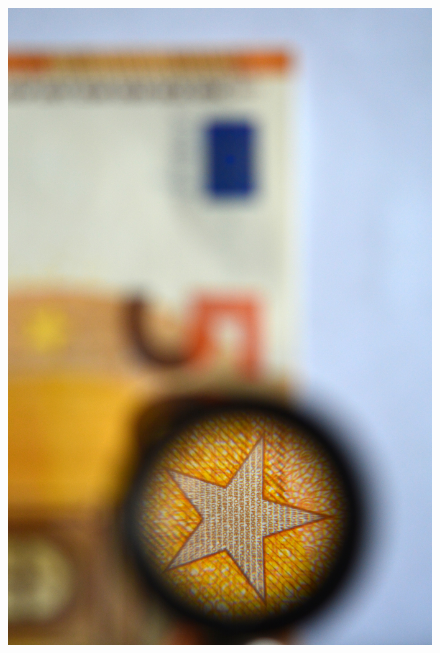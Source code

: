 \begin{figure}[htp]
\centering
\includegraphics[width=7truecm]{slike/02_photos_lupa.jpg}\hfill

\end{figure}
